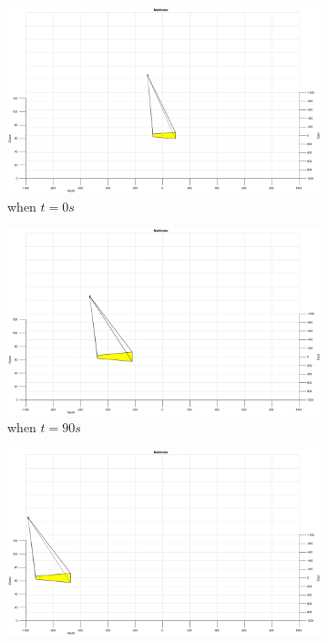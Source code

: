 \begin{figure}[htbp]
	\centering
	\begin{subfigure}[t]{0.32\linewidth}
		\includegraphics[width=\textwidth]{images/chapter4/inertial_UAV_-5mps}
		\caption{when $t=0s$}
	\end{subfigure}
	\begin{subfigure}[t]{0.32\linewidth}
		\includegraphics[width=\textwidth]{images/chapter4/inertial_UAV_-5mps_90s}
		\caption{when $t=90s$}
	\end{subfigure}
	\begin{subfigure}[t]{0.32\linewidth}
		\includegraphics[width=\textwidth]{images/chapter4/inertial_UAV_-5mps_180s}

\end{subfigure}
\end{figure}
